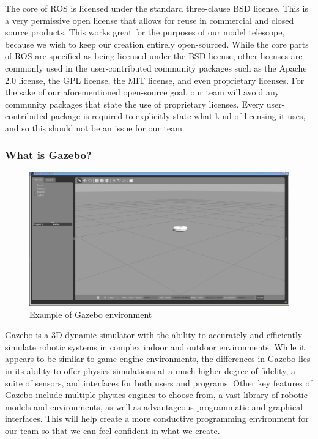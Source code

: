 \documentclass[12pt]{article}
\begin{document}
The core of ROS is licensed under the standard three-clause BSD license. This is a very permissive open license that allows for reuse in commercial and closed source products. This works great for the purposes of our model telescope, because we wish to keep our creation entirely open-sourced. While the core parts of ROS are specified as being licensed under the BSD license, other licenses are commonly used in the user-contributed community packages such as the Apache 2.0 license, the GPL license, the MIT license, and even proprietary licenses. For the sake of our aforementioned open-source goal, our team will avoid any community packages that state the use of proprietary licenses. Every user-contributed package is required to explicitly state what kind of licensing it uses, and so this should not be an issue for our team.

\subsubsection{What is Gazebo?}

\begin{figure}[h]
	\centering
	\includegraphics[width=0.98\linewidth]{gazebo}
	\caption{Example of Gazebo environment}
\end{figure}

Gazebo is a 3D dynamic simulator with the ability to accurately and efficiently simulate robotic systems in complex indoor and outdoor environments. While it appears to be similar to game engine environments, the differences in Gazebo lies in its ability to offer physics simulations at a much higher degree of fidelity, a suite of sensors, and interfaces for both users and programs.\cite{GazeboDescription} Other key features of Gazebo include multiple physics engines to choose from, a vast library of robotic models and environments, as well as advantageous programmatic and graphical interfaces. This will help create a more conductive programming environment for our team so that we can feel confident in what we create.
\end{document}
